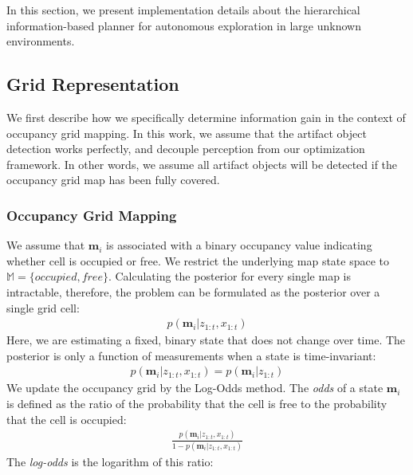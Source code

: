 \documentclass[letterpaper, 10 pt, conference]{ieeeconf}  %
\begin{document}
In this section, we present implementation details about the hierarchical information-based planner for autonomous exploration in large unknown environments.

\subsection{Grid Representation}
We first describe how we specifically determine information gain in the context of occupancy grid mapping.  In this work, we assume that the artifact object detection works perfectly, and decouple perception from our optimization framework.
In other words, we assume all artifact objects will be detected if the occupancy grid map has been fully covered.

\subsubsection{Occupancy Grid Mapping}
We assume that $\textbf{m}_i$ is associated with a binary occupancy value indicating whether cell is occupied or free.  We restrict the underlying map state space to $\mathbb{M}=\{occupied, free\}$. Calculating the posterior for every single map is intractable, therefore, the problem can be formulated as the posterior over a single grid cell: 
\begin{align}
    p(\textbf{m}_i | z_{1:t},x_{1:t})
\end{align}
Here, we are estimating a fixed, binary state that does not change over time. The posterior is only a function of measurements when a state is time-invariant:
\begin{align}
    p(\textbf{m}_i | z_{1:t},x_{1:t}) = p(\textbf{m}_i | z_{1:t})
    \label{static}
\end{align}
We update the occupancy grid by the Log-Odds method. The \emph{odds} of a state $\textbf{m}_i$ is defined as the ratio of the probability that the cell is free to the probability that the cell is occupied:
\begin{align}
    \frac{p(\textbf{m}_i | z_{1:t},x_{1:t})}{1-p(\textbf{m}_i | z_{1:t},x_{1:t})}
    \label{odd}
\end{align}
The \emph{log-odds} is the logarithm of this ratio:
\end{document}
